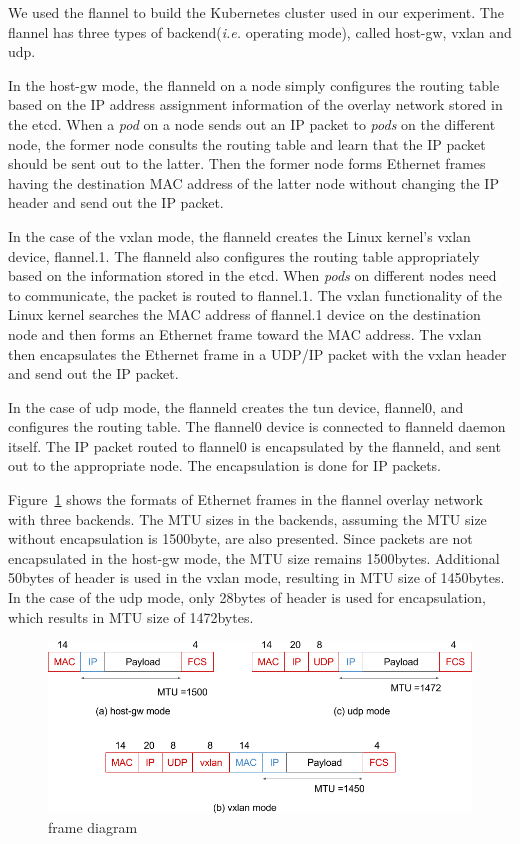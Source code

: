 We used the flannel to build the Kubernetes cluster used in our experiment. 
The flannel has three types of backend({\it i.e.} operating mode), called host-gw, vxlan and udp\cite{CoreOSFlannelBackend}.

In the host-gw mode, the flanneld on a node simply configures the routing table 
based on the IP address assignment information of the overlay network stored in the etcd. 
When a {\em pod} on a node sends out an IP packet to {\em pods} on the different node, 
the former node consults the routing table and learn that the IP packet should be sent out to the latter.
Then the former node forms Ethernet frames having the destination MAC address of the latter node without changing the IP header and send out the IP packet.

In the case of the vxlan mode, the flanneld creates the Linux kernel's vxlan device, flannel.1. 
The flanneld also configures the routing table appropriately based on the information stored in the etcd.
When {\em pods} on different nodes need to communicate, the packet is routed to flannel.1.
The vxlan functionality of the Linux kernel searches the MAC address of flannel.1 device on the destination node and  
then forms an Ethernet frame toward the MAC address.
The vxlan then encapsulates the Ethernet frame in a UDP/IP packet with the vxlan header and send out the IP packet.

In the case of udp mode, the flanneld creates the tun device, flannel0, and configures the routing table.
The flannel0 device is connected to flanneld daemon itself.
The IP packet routed to flannel0 is encapsulated by the flanneld, and sent out 
to the appropriate node. 
The encapsulation is done for IP packets.

Figure~\ref{fig:flannel-packet-diagram} shows the formats of Ethernet frames in the flannel overlay network with three backends. 
The MTU sizes in the backends, assuming the MTU size without encapsulation is 1500byte, are also presented.
Since packets are not encapsulated in the host-gw mode, the MTU size remains 1500bytes.
Additional 50bytes of header is used in the vxlan mode, resulting in MTU size of 1450bytes.
In the case of the udp mode, only 28bytes of header is used for encapsulation, which results in MTU size of 1472bytes.

\begin{figure}
\includegraphics[width=\columnwidth]{Figs/flannel-packet-diagram}
\caption{frame diagram}
\label{fig:flannel-packet-diagram}
\end{figure}

